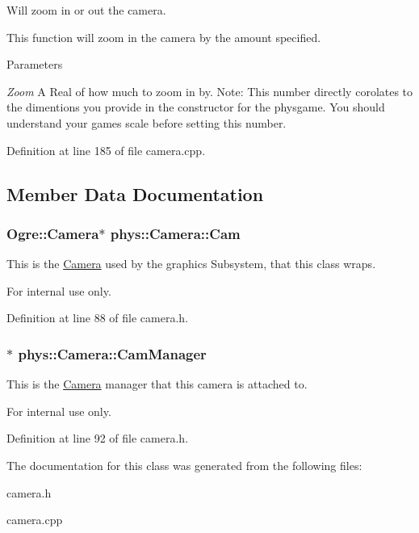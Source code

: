 Will zoom in or out the camera. 

This function will zoom in the camera by the amount specified. 
\begin{DoxyParams}{Parameters}
\item[{\em Zoom}]A Real of how much to zoom in by. Note: This number directly corolates to the dimentions you provide in the constructor for the physgame. You should understand your games scale before setting this number. \end{DoxyParams}


Definition at line 185 of file camera.cpp.



\subsection{Member Data Documentation}
\hypertarget{classphys_1_1Camera_a91622148b9b9a9ae1554c828f7e2fc89}{
\subsubsection[{Cam}]{\setlength{\rightskip}{0pt plus 5cm}Ogre::Camera$\ast$ {\bf phys::Camera::Cam}}}
\label{d9/df8/classphys_1_1Camera_a91622148b9b9a9ae1554c828f7e2fc89}


This is the \hyperlink{classphys_1_1Camera}{Camera} used by the graphics Subsystem, that this class wraps. 

\begin{DoxyInternal}{For internal use only.}
\end{DoxyInternal}


Definition at line 88 of file camera.h.

\hypertarget{classphys_1_1Camera_a909203ede748deb1b587a8758ba8cec4}{
\subsubsection[{CamManager}]{$\ast$ {\bf phys::Camera::CamManager}}}
\label{d9/df8/classphys_1_1Camera_a909203ede748deb1b587a8758ba8cec4}


This is the \hyperlink{classphys_1_1Camera}{Camera} manager that this camera is attached to. 

\begin{DoxyInternal}{For internal use only.}
\end{DoxyInternal}


Definition at line 92 of file camera.h.



The documentation for this class was generated from the following files:\begin{DoxyCompactItemize}
\item 
camera.h\item 
camera.cpp\end{DoxyCompactItemize}

